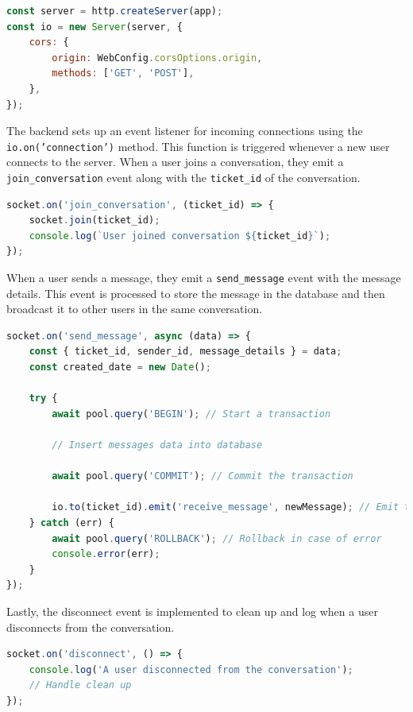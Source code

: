 \begin{lstlisting}[language=Javascript, breaklines=true, caption=Create Socket.io HTTP server]
const server = http.createServer(app);
const io = new Server(server, {
	cors: {
		origin: WebConfig.corsOptions.origin,
		methods: ['GET', 'POST'],
	},
});
\end{lstlisting}	



The backend sets up an event listener for incoming connections using the \texttt{io.on('connection')} method. This function is triggered whenever a new user connects to the server. When a user joins a conversation, they emit a \texttt{join\_conversation} event along with the \texttt{ticket\_id} of the conversation.

\begin{lstlisting}[language=Javascript, breaklines=true, caption=Socket.io join\_conversation event]
socket.on('join_conversation', (ticket_id) => {
	socket.join(ticket_id);
	console.log(`User joined conversation ${ticket_id}`);
});
\end{lstlisting}	

When a user sends a message, they emit a \texttt{send\_message} event with the message details. This event is processed to store the message in the database and then broadcast it to other users in the same conversation.


\begin{lstlisting}[language=Javascript, breaklines=true, caption=Socket.io send\_message event]
socket.on('send_message', async (data) => {
	const { ticket_id, sender_id, message_details } = data;
	const created_date = new Date();
	
	try {
		await pool.query('BEGIN'); // Start a transaction
		
		// Insert messages data into database
		
		await pool.query('COMMIT'); // Commit the transaction
		
		io.to(ticket_id).emit('receive_message', newMessage); // Emit the new message to the room
	} catch (err) {
		await pool.query('ROLLBACK'); // Rollback in case of error
		console.error(err);
	}
});

\end{lstlisting}	

Lastly, the disconnect event is implemented to clean up and log when a user disconnects from the conversation.
\begin{lstlisting}[language=Javascript, breaklines=true, caption=Socket.io disconnect event]
socket.on('disconnect', () => {
	console.log('A user disconnected from the conversation');
	// Handle clean up
});
\end{lstlisting}

